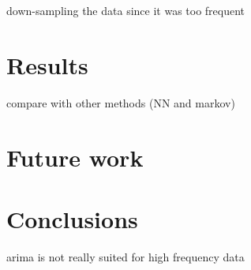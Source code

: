 \documentclass[12pt,a4paper,titlepage]{report}
\begin{document}
down-sampling the data since it was too frequent

\section{Results}


compare with other methods (NN and markov)


\section{Future work}

\section{Conclusions}

arima is not really suited for high frequency data

\newpage


\end{document}
